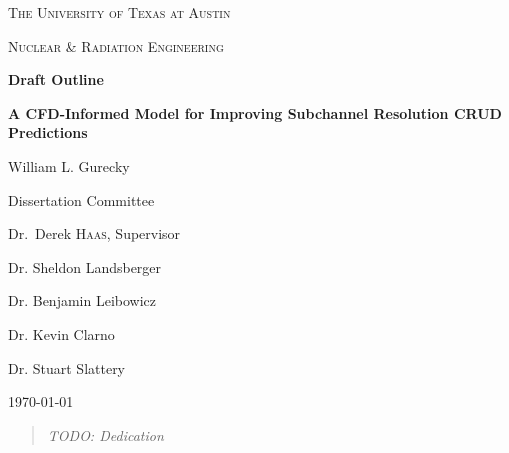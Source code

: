 

\begin{titlepage}
	\centering
	{\scshape\LARGE The University of Texas at Austin \par}
	\vspace{1cm}
	{\scshape\Large Nuclear \& Radiation Engineering \par}
	\vspace{1.5cm}
	
	        {\huge\bfseries Draft Outline \par}
	{\large\bfseries A CFD-Informed Model for Improving Subchannel Resolution CRUD Predictions\par}

	\vspace{2cm}
	{\Large William L. Gurecky \par}
	\vfill

	\begin{flushright}
	Dissertation Committee \par
	\bigskip
	Dr.~Derek \textsc{Haas}, Supervisor \par
	Dr. Sheldon Landsberger \par
	Dr. Benjamin Leibowicz \par
	Dr. Kevin Clarno \par
	Dr. Stuart Slattery \par
	\end{flushright}
	\vfill
	{\large \today\par}
\end{titlepage}
\pagebreak
\tableofcontents
\pagebreak

\clearpage
\vspace*{\fill}
\thispagestyle{empty} %
\begin{quotation}
\em %
TODO: Dedication
\end{quotation}
\vspace*{\fill}

\pagebreak
